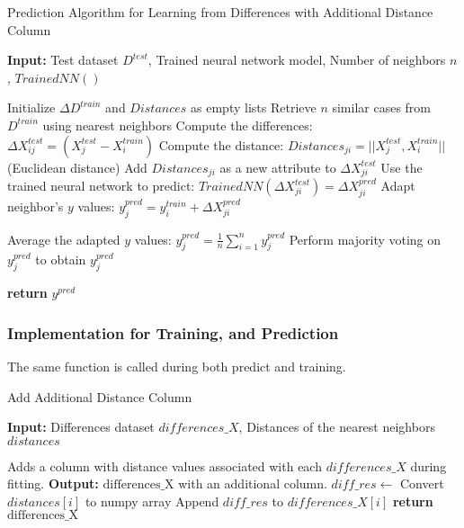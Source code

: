 \documentclass[a4paper, 12pt]{report}
\begin{document}
\begin{algorithm}[H]
	\caption{Prediction Algorithm for Learning from Differences with Additional Distance Column}
	\label{alg:learning_from_differences_variant_3_predict}
	\textbf{Input:} Test dataset $D^{test}$, Trained neural network model, Number of neighbors $n$, $Trained NN()$

	\begin{algorithmic}[1]
		\State Initialize $\Delta D^{train}$ and $Distances$ as empty lists
		    \State Retrieve $n$ similar cases from $D^{train}$ using nearest neighbors
		        \State Compute the differences: $\Delta X^{test}_{ij} = (X^{test}_j - X^{train}_i)$
		        \State Compute the distance: $Distances_{ji} = ||X^{test}_j,  X^{train}_i||$ (Euclidean distance)
		        \State Add $Distances_{ji}$ as a new attribute to $\Delta X^{test}_{ji}$
		        \State Use the trained neural network to predict: $Trained NN(\Delta X^{test}_{ji}) = \Delta X^{pred}_{ji}$
		        \State Adapt neighbor's $y$ values: $y^{pred}_j = y^{train}_i + \Delta X^{pred}_{ji}$
		    \EndFor

		        \State Average the adapted $y$ values: $y^{pred}_j = \frac{1}{n} \sum_{i=1}^{n} y^{pred}_j$
		        \State Perform majority voting on $y^{pred}_j$ to obtain $y^{pred}_j$
		    \EndIf

		    \State \textbf{return} $y^{pred}$
		\EndFor
	\end{algorithmic}
\end{algorithm}
\clearpage
\subsubsection{Implementation for Training, and Prediction}
The same function is called during both predict and training.
\begin{algorithm}[H]
    \caption{Add Additional Distance Column}
    \textbf{Input:}  Differences dataset $differences\_X$, Distances of the nearest neighbors $distances$
    \begin{algorithmic}[1]
            \State Adds a column with distance values associated with each $differences\_X$ during fitting.
            \State \textbf{Output:} $\text{differences\_X}$ with an additional column.
                \State $diff\_res \gets$ Convert $distances[i]$ to numpy array
                \State Append $diff\_res$ to $differences\_X[i]$
            \EndFor
            \State \textbf{return} $\text{differences\_X}$
        \EndFunction
    \end{algorithmic}
\end{algorithm}
\end{document}
